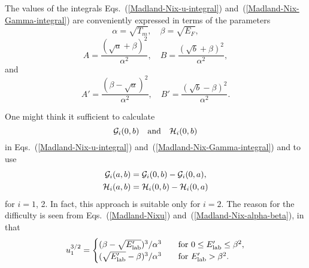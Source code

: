 The values of the integrals Eqs.~(\ref{Madland-Nix-u-integral})
and~(\ref{Madland-Nix-Gamma-integral}) are conveniently expressed
in terms of the parameters
\begin{equation}
  \alpha = \sqrt{T_m}, \quad
  \beta = \sqrt{E_F},
 \label{Madland-Nix-alpha-beta}
\end{equation}
\begin{equation}
  A = \frac{(\sqrt{a} + \beta)^2}{\alpha^2}, \quad
  B = \frac{(\sqrt{b} + \beta)^2}{\alpha^2},
 \label{Madland-Nix-A-B}
\end{equation}
and
\begin{equation}
  A' = \frac{( \beta - \sqrt{a})^2}{\alpha^2}, \quad
  B' = \frac{(\sqrt{b} - \beta)^2}{\alpha^2}.
 \label{Madland-Nix-A-B-prime}
\end{equation}

One might think it sufficient to calculate
$$
  {\cal G}_i( 0, b )  \quad \text{and} \quad
  {\cal H}_i( 0, b ) 
$$
in Eqs.~(\ref{Madland-Nix-u-integral}) and~(\ref{Madland-Nix-Gamma-integral})
and to use
\begin{equation*}
 \begin{split}
   {\cal G}_i( a, b ) &= {\cal G}_i( 0, b ) - {\cal G}_i( 0, a ), \\
   {\cal H}_i( a, b ) &= {\cal H}_i( 0, b ) - {\cal H}_i( 0, a )
 \end{split}
\end{equation*}
for $i = 1$, 2.  In fact, this approach is suitable only for $i = 2$.
The reason for the difficulty is seen from Eqs.~(\ref{Madland-Nixu})
and~(\ref{Madland-Nix-alpha-beta}), in that
\begin{equation}
  u_1^{3/2} = \begin{cases}
    (\beta - \sqrt{E_{\text{lab}}' })^3 / \alpha^3  \quad &\text{for $0 \le E_{\text{lab}}'  \le \beta^2$}, \\
    (\sqrt{E_{\text{lab}}' } - \beta)^3 / \alpha^3 \quad &\text{for $E_{\text{lab}}'  > \beta^2$}.
    \end{cases}
 \label{Madland-Nix-u1}
\end{equation}

